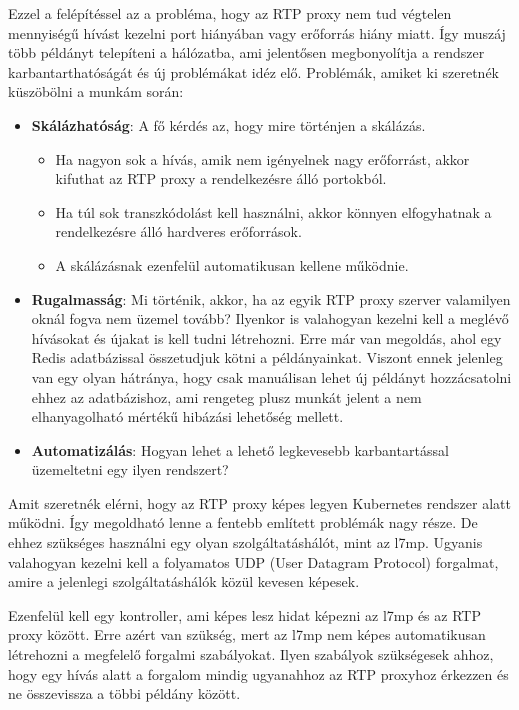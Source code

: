 Ezzel a felépítéssel az a probléma, hogy az RTP proxy nem tud végtelen mennyiségű
hívást kezelni port hiányában vagy erőforrás hiány miatt. Így muszáj több példányt
telepíteni a hálózatba, ami jelentősen megbonyolítja a rendszer 
karbantarthatóságát és új problémákat idéz elő. Problémák, amiket ki szeretnék 
küszöbölni a munkám során:

\begin{itemize}
	\item \textbf{Skálázhatóság}: A fő kérdés az, hogy mire történjen a skálázás. 
	\begin{itemize}
		\item Ha nagyon sok a hívás, amik nem igényelnek nagy erőforrást, akkor
		kifuthat az RTP proxy a rendelkezésre álló portokból.
		\item Ha túl sok transzkódolást kell használni, akkor könnyen elfogyhatnak
		a rendelkezésre álló hardveres erőforrások.
		\item A skálázásnak ezenfelül automatikusan kellene működnie. 
	\end{itemize}
	\item \textbf{Rugalmasság}: Mi történik, akkor, ha az egyik RTP proxy szerver
	valamilyen oknál fogva nem üzemel tovább? Ilyenkor is valahogyan kezelni 
	kell a meglévő hívásokat és újakat is kell tudni létrehozni. Erre már van 
	megoldás, ahol egy Redis adatbázissal összetudjuk kötni a példányainkat. 
	Viszont ennek jelenleg van egy olyan hátránya, hogy csak manuálisan lehet 
	új példányt hozzácsatolni ehhez az adatbázishoz, ami rengeteg plusz munkát 
	jelent a nem elhanyagolható mértékű hibázási lehetőség mellett.
	\item \textbf{Automatizálás}: Hogyan lehet a lehető legkevesebb 
	karbantartással üzemeltetni egy ilyen rendszert? 
\end{itemize}

Amit szeretnék elérni, hogy az RTP proxy képes legyen Kubernetes rendszer alatt 
működni. Így megoldható lenne a fentebb említett problémák nagy része. De 
ehhez szükséges használni egy olyan szolgáltatáshálót, mint az l7mp. Ugyanis 
valahogyan kezelni kell a folyamatos UDP (User Datagram Protocol) forgalmat, amire
a jelenlegi szolgáltatáshálók közül kevesen képesek.

Ezenfelül kell egy kontroller, ami képes lesz hidat képezni az l7mp és az RTP 
proxy között. Erre azért van szükség, mert az l7mp nem képes automatikusan 
létrehozni a megfelelő forgalmi szabályokat. Ilyen szabályok szükségesek ahhoz, 
hogy egy hívás alatt a forgalom mindig ugyanahhoz az RTP proxyhoz érkezzen és 
ne összevissza a többi példány között.  

